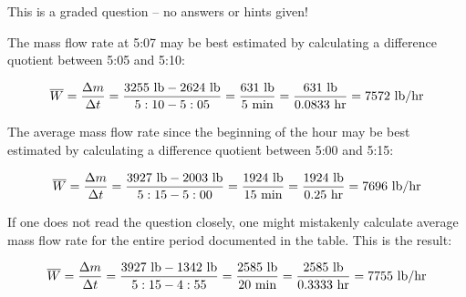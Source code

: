 \vskip 10pt

\vfil 

\eject






This is a graded question -- no answers or hints given!







The mass flow rate at 5:07 may be best estimated by calculating a difference quotient between 5:05 and 5:10:

$$\overline{W} = {\Delta m \over \Delta t} = {3255 \hbox{ lb} - 2624 \hbox{ lb} \over 5:10 - 5:05} = {631 \hbox{ lb} \over 5 \hbox{ min}} = {631 \hbox{ lb} \over 0.0833 \hbox{ hr}} = 7572 \hbox{ lb/hr}$$

\vskip 10pt

The average mass flow rate since the beginning of the hour may be best estimated by calculating a difference quotient between 5:00 and 5:15:

$$\overline{W} = {\Delta m \over \Delta t} = {3927 \hbox{ lb} - 2003 \hbox{ lb} \over 5:15 - 5:00} = {1924 \hbox{ lb} \over 15 \hbox{ min}} = {1924 \hbox{ lb} \over 0.25 \hbox{ hr}} = 7696 \hbox{ lb/hr}$$

\vskip 10pt

If one does not read the question closely, one might mistakenly calculate average mass flow rate for the entire period documented in the table.  This is the result:

$$\overline{W} = {\Delta m \over \Delta t} = {3927 \hbox{ lb} - 1342 \hbox{ lb} \over 5:15 - 4:55} = {2585 \hbox{ lb} \over 20 \hbox{ min}} = {2585 \hbox{ lb} \over 0.3333 \hbox{ hr}} = 7755 \hbox{ lb/hr}$$




